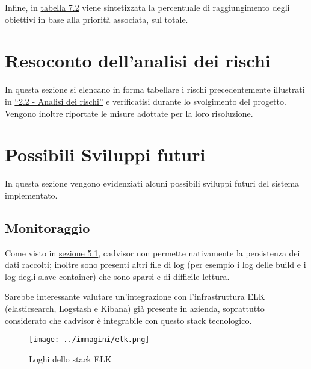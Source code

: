 

Infine, in \hyperref[tab:resume]{tabella 7.2} viene sintetizzata la percentuale di raggiungimento degli obiettivi in base alla priorità associata, sul totale.


\newpage
\section{Resoconto dell'analisi dei rischi}

In questa sezione si elencano in forma tabellare i rischi precedentemente illustrati in {\hyperref[tab:rischi]{``2.2 - Analisi dei rischi''}} e verificatisi durante lo svolgimento del progetto. Vengono inoltre riportate le misure adottate per la loro risoluzione.



\section{Possibili Sviluppi futuri}
In questa sezione vengono evidenziati alcuni possibili sviluppi futuri del sistema implementato.\\

\subsection{Monitoraggio}
Come visto in \hyperref[sec:monitoring]{sezione 5.1}, cadvisor non permette nativamente la persistenza dei dati raccolti; inoltre sono presenti altri file di log (per esempio i log delle \gls{build} e i log degli \gls{slave} container) che sono sparsi e di difficile lettura. 

Sarebbe interessante valutare un'integrazione con l'infrastruttura ELK (elasticsearch, Logstash e Kibana) già presente in azienda, soprattutto considerato che cadvisor è integrabile con questo stack tecnologico.

\begin{figure}[H]
    \capstart
    \centering
    \texttt{[image: ../immagini/elk.png]}
    \caption{Loghi dello stack ELK}
\end{figure}

